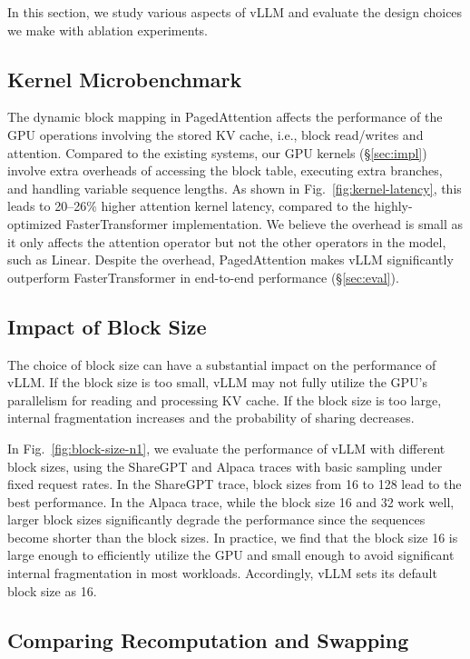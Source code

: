 In this section, we study various aspects of vLLM and evaluate the design choices we make with ablation experiments.

\subsection{Kernel Microbenchmark}

The dynamic block mapping in PagedAttention affects the performance of the GPU operations involving the stored KV cache, i.e., block read/writes and attention. Compared to the existing systems, our GPU kernels (\S\ref{sec:impl}) involve extra overheads of accessing the block table, executing extra branches, and handling variable sequence lengths. As shown in Fig.~\ref{fig:kernel-latency}, this leads to 20--26\% higher attention kernel latency, compared to the highly-optimized FasterTransformer implementation. We believe the overhead is small as it only affects the attention operator but not the other operators in the model, such as Linear. Despite the overhead, PagedAttention makes vLLM significantly outperform FasterTransformer in end-to-end performance (\S\ref{sec:eval}).

\subsection{Impact of Block Size}
\label{sec:eval:blocksize}

The choice of block size can have a substantial impact on the performance of vLLM. If the block size is too small, vLLM may not fully utilize the GPU's parallelism for reading and processing KV cache. If the block size is too large, internal fragmentation increases and the probability of sharing decreases.

In Fig.~\ref{fig:block-size-n1}, we evaluate the performance of vLLM with different block sizes, using the ShareGPT and Alpaca traces with basic sampling under fixed request rates. In the ShareGPT trace, block sizes from 16 to 128 lead to the best performance. In the Alpaca trace, while the block size 16 and 32 work well, larger block sizes significantly degrade the performance since the sequences become shorter than the block sizes. In practice, we find that the block size 16 is large enough to efficiently utilize the GPU and small enough to avoid significant internal fragmentation in most workloads. Accordingly, vLLM sets its default block size as 16.

\subsection{Comparing Recomputation and Swapping}
\label{sec:eval:scheduling}

